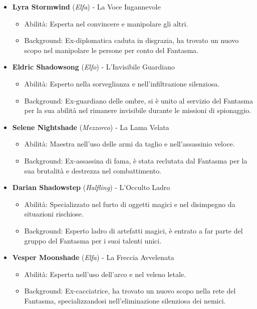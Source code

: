 \documentclass{article}
\begin{document}
\begin{itemize}
  \item \textbf{Lyra Stormwind} (\textit{Elfa}) - La Voce Ingannevole
    \begin{itemize}
      \item Abilità: Esperta nel convincere e manipolare gli altri.
      \item Background: Ex-diplomatica caduta in disgrazia, ha trovato un nuovo scopo nel manipolare le persone per conto del Fantasma.
    \end{itemize}
    \item \textbf{Eldric Shadowsong} (\textit{Elfo}) - L'Invisibile Guardiano
  \begin{itemize}
    \item Abilità: Esperto nella sorveglianza e nell'infiltrazione silenziosa.
    \item Background: Ex-guardiano delle ombre, si è unito al servizio del Fantasma per la sua abilità nel rimanere invisibile durante le missioni di spionaggio.
  \end{itemize}

\item \textbf{Selene Nightshade} (\textit{Mezzorco}) - La Lama Velata
  \begin{itemize}
    \item Abilità: Maestra nell'uso delle armi da taglio e nell'assassinio veloce.
    \item Background: Ex-assassina di fama, è stata reclutata dal Fantasma per la sua brutalità e destrezza nel combattimento.
  \end{itemize}

\item \textbf{Darian Shadowstep} (\textit{Halfling}) - L'Occulto Ladro
  \begin{itemize}
    \item Abilità: Specializzato nel furto di oggetti magici e nel disimpegno da situazioni rischiose.
    \item Background: Esperto ladro di artefatti magici, è entrato a far parte del gruppo del Fantasma per i suoi talenti unici.
  \end{itemize}

\item \textbf{Vesper Moonshade} (\textit{Elfa}) - La Freccia Avvelenata
  \begin{itemize}
    \item Abilità: Esperta nell'uso dell'arco e nel veleno letale.
    \item Background: Ex-cacciatrice, ha trovato un nuovo scopo nella rete del Fantasma, specializzandosi nell'eliminazione silenziosa dei nemici.
  \end{itemize}


\end{itemize}
\end{document}
